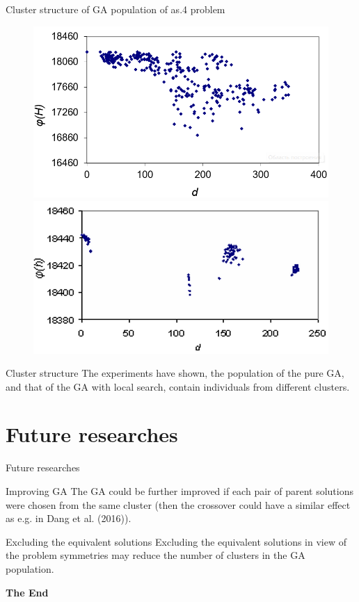 \documentclass[aspectratio=169,xcolor=dvipsnames]{beamer}
\begin{document}
\begin{frame}{Cluster structure of GA population of as.4 problem}
    \begin{figure}
    \includegraphics[scale=0.4]{ga_klaster}
    \includegraphics[scale=0.43]{gals_klaster}
    \end{figure}
        \begin{block}{Cluster structure}
 The experiments have shown, the population of the pure GA, and that of the GA with local search, contain individuals from different clusters.
    \end{block}
\end{frame}

\section{Future researches}

\begin{frame}{Future researches}
        \begin{block}{Improving GA}
The GA could be further improved if each pair of parent solutions were chosen from the same cluster (then the crossover could have a similar effect as e.g. in Dang et al. (2016)).
    \end{block}
    \vspace{1cm}	
            \begin{block}{Excluding the equivalent solutions}
Excluding the equivalent solutions in view of the problem symmetries may 
reduce the number of clusters in the GA population.    
    \end{block}
 \end{frame}


\begin{frame}
    \Huge{\centerline{\textbf{The End}}}
\end{frame}

\end{document}
